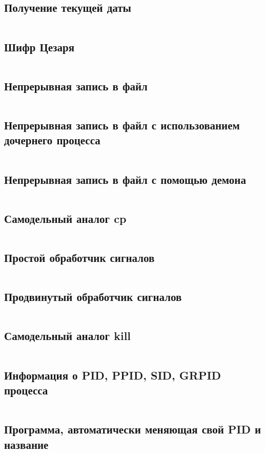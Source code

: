 \subsection{Получение текущей даты}
\inputminted{c}{src/timestamp.c}

\subsection{Шифр Цезаря}
\inputminted{c}{src/encode.c}

\subsection{Непрерывная запись в файл}
\inputminted{c}{src/continous_write_to_file.c}

\subsection{Непрерывная запись в файл с использованием дочернего процесса}
\inputminted{c}{src/continous_write_to_file_with_fork.c}

\subsection{Непрерывная запись в файл с помощью демона}
\inputminted{c}{src/daemon.c}

\subsection{Самодельный аналог cp}
\inputminted{c}{src/copy.c}

\subsection{Простой обработчик сигналов}
\inputminted{c}{src/simple_signal_handler.c}

\subsection{Продвинутый обработчик сигналов}
\inputminted{c}{src/advanced_signal_handler.c}

\subsection{Самодельный аналог kill}
\inputminted{c}{src/kill.c}

\subsection{Информация о PID, PPID, SID, GRPID процесса}
\inputminted{c}{src/pid_sid_grp_info.c}

\subsection{Программа, автоматически меняющая свой PID и название}
\inputminted{c}{src/change_pid.c}
